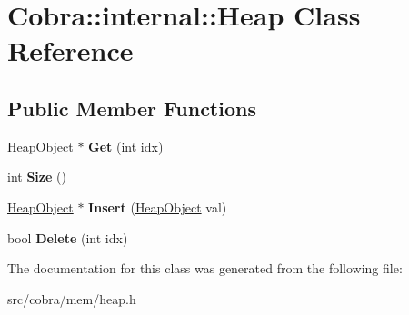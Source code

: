 \hypertarget{class_cobra_1_1internal_1_1_heap}{\section{Cobra\+:\+:internal\+:\+:Heap Class Reference}
\label{class_cobra_1_1internal_1_1_heap}
}
\subsection*{Public Member Functions}
\begin{DoxyCompactItemize}
\item 
\hypertarget{class_cobra_1_1internal_1_1_heap_aabea35e11b9ad9bb9d90b1c027424396}{\hyperlink{struct_cobra_1_1internal_1_1_heap_object}{Heap\+Object} $\ast$ {\bfseries Get} (int idx)}\label{class_cobra_1_1internal_1_1_heap_aabea35e11b9ad9bb9d90b1c027424396}

\item 
\hypertarget{class_cobra_1_1internal_1_1_heap_a42859090edacdd5de263e27711a9eca6}{int {\bfseries Size} ()}\label{class_cobra_1_1internal_1_1_heap_a42859090edacdd5de263e27711a9eca6}

\item 
\hypertarget{class_cobra_1_1internal_1_1_heap_a6110bb56a06dd1873c884c254f87d60e}{\hyperlink{struct_cobra_1_1internal_1_1_heap_object}{Heap\+Object} $\ast$ {\bfseries Insert} (\hyperlink{struct_cobra_1_1internal_1_1_heap_object}{Heap\+Object} val)}\label{class_cobra_1_1internal_1_1_heap_a6110bb56a06dd1873c884c254f87d60e}

\item 
\hypertarget{class_cobra_1_1internal_1_1_heap_a0d8e49caa6e2a2c7e734fcea54e9b19d}{bool {\bfseries Delete} (int idx)}\label{class_cobra_1_1internal_1_1_heap_a0d8e49caa6e2a2c7e734fcea54e9b19d}

\end{DoxyCompactItemize}


The documentation for this class was generated from the following file\+:\begin{DoxyCompactItemize}
\item 
src/cobra/mem/heap.\+h\end{DoxyCompactItemize}
